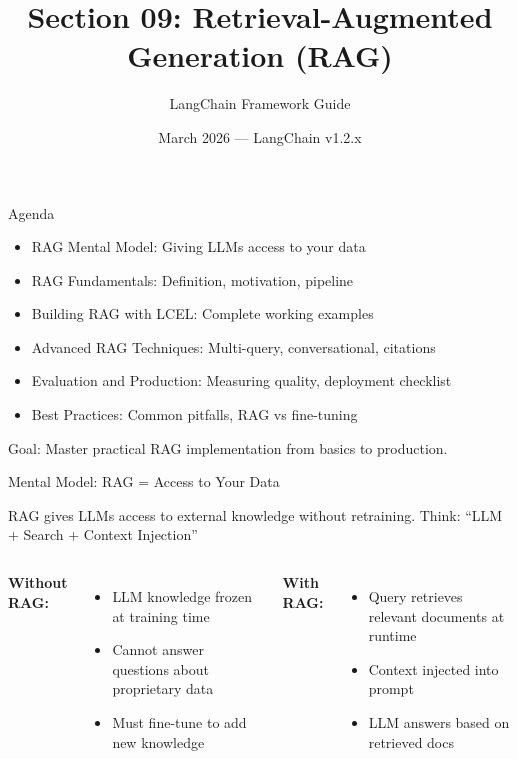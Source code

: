 \documentclass[aspectratio=169,11pt]{beamer}
\title[LangChain RAG]{Section 09: Retrieval-Augmented Generation (RAG)}
\author{LangChain Framework Guide}
\date{March 2026 --- LangChain v1.2.x}
\begin{document}
\begin{frame}
  \titlepage
\end{frame}

\begin{frame}{Agenda}
  \begin{itemize}
    \setlength{\itemsep}{1pt}
    \item RAG Mental Model: Giving LLMs access to your data
    \item RAG Fundamentals: Definition, motivation, pipeline
    \item Building RAG with LCEL: Complete working examples
    \item Advanced RAG Techniques: Multi-query, conversational, citations
    \item Evaluation and Production: Measuring quality, deployment checklist
    \item Best Practices: Common pitfalls, RAG vs fine-tuning
  \end{itemize}
  \vspace{1cm}
  \textcolor{lcblue}{Goal: Master practical RAG implementation from basics to production.}
\end{frame}

\begin{frame}{Mental Model: RAG = Access to Your Data}
  \begin{conceptbox}
    RAG gives LLMs access to external knowledge without retraining.
    Think: ``LLM + Search + Context Injection''
  \end{conceptbox}
  \vspace{0.08cm}

  \begin{columns}[T]
    \textbf{Without RAG:}
    \begin{itemize}
    \setlength{\itemsep}{1pt}
      \item LLM knowledge frozen at training time
      \item Cannot answer questions about proprietary data
      \item Must fine-tune to add new knowledge
    \end{itemize}

    \textbf{With RAG:}
    \begin{itemize}
    \setlength{\itemsep}{1pt}
      \item Query retrieves relevant documents at runtime
      \item Context injected into prompt
      \item LLM answers based on retrieved docs
    \end{itemize}
  \end{columns}
\end{frame}
\end{document}

